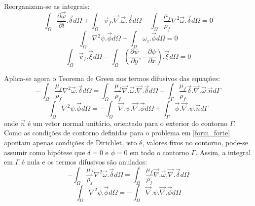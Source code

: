 Reorganizam-se as integrais:
\begin{equation}
    \int_{\Omega}
    \dfrac{\partial \vec{\omega}}{\partial t}
    .\vec{\delta} d\Omega +
    \int_{\Omega}
    \vec{v}_f.\vec{\nabla}.\vec{\omega}
    .\vec{\delta} d\Omega -
    \int_{\Omega}
    \dfrac{\mu_f}{\rho_f} \nabla^2 \vec{\omega}
    .\vec{\delta} d\Omega = 0
\end{equation}
\begin{equation}
    \int_{\Omega}
    \nabla^2\psi
    .\vec{\phi} d\Omega +
    \int_{\Omega}
    \omega_z
    .\vec{\phi} d\Omega = 0
\end{equation}
\begin{equation}
    \int_{\Omega}
    \vec{v}_f
    .\vec{\xi} d\Omega -
    \int_{\Omega}
    \left(\dfrac{\partial \psi}{\partial y},
    -\dfrac{\partial \psi}{\partial x} \right)
    .\vec{\xi} d\Omega = 0
\end{equation}

Aplica-se agora o Teorema de Green nos termos difusivos das equações:
\begin{equation}
    -\int_{\Omega}
    \dfrac{\mu_f}{\rho_f} \nabla^2 \vec{\omega}
    .\vec{\delta} d\Omega = 
    \int_{\Omega}
    \dfrac{\mu_f}{\rho_f}
    \vec{\nabla}.\vec{\omega}.\vec{\nabla}
    .\vec{\delta} d\Omega -
    \int_{\Gamma}
    \dfrac{\mu_f}{\rho_f}
    \vec{\delta}.\vec{\nabla}.\vec{\omega}
    .\vec{n} d\Gamma
\end{equation}
\begin{equation}
    \int_{\Omega}
    \nabla^2\psi
    .\vec{\phi} d\Omega = -
    \int_{\Omega}
    \vec{\nabla}.\psi.\vec{\nabla}
    .\vec{\phi} d\Omega +
    \int_{\Gamma}
    \vec{\phi}.\vec{\nabla}.\psi
    .\vec{n} d\Gamma
\end{equation}
onde $\vec{n}$ é um vetor normal unitário, orientado para o exterior do contorno $\Gamma$.
Como as condições de contorno definidas para o problema em \ref{form_forte} apontam apenas condições de Dirichlet, isto é, valores fixos no contorno, pode-se assumir como hipótese que $\delta=0$ e $\phi=0$ em todo o contorno $\Gamma$.
Assim, a integral em $\Gamma$ é nula e os termos difusivos são anulados:
\begin{equation}
    -\int_{\Omega}
    \dfrac{\mu_f}{\rho_f} \nabla^2 \vec{\omega}
    .\vec{\delta} d\Omega = 
    \int_{\Omega}
    \dfrac{\mu_f}{\rho_f}
    \vec{\nabla}.\vec{\omega}.\vec{\nabla}
    .\vec{\delta} d\Omega
\end{equation}
\begin{equation}
    \int_{\Omega}
    \nabla^2\psi
    .\vec{\phi} d\Omega = -
    \int_{\Omega}
    \vec{\nabla}.\psi.\vec{\nabla}
    .\vec{\phi} d\Omega
\end{equation}

